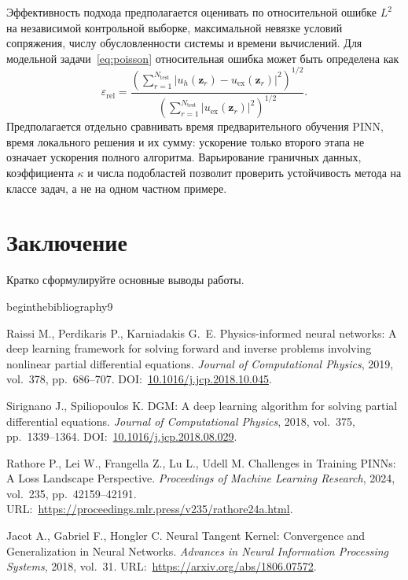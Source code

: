 \documentclass{misisarticle}
\begin{document}
Эффективность подхода предполагается оценивать по относительной ошибке $L^2$ на независимой контрольной выборке, максимальной невязке условий сопряжения, числу обусловленности системы и времени вычислений. Для модельной задачи~\eqref{eq:poisson} относительная ошибка может быть определена как
\begin{equation}
 \varepsilon_{\mathrm{rel}}=
 \frac{\left(\sum_{r=1}^{N_{\mathrm{test}}}
 |u_h(\mathbf z_r)-u_{\mathrm{ex}}(\mathbf z_r)|^2\right)^{1/2}}
 {\left(\sum_{r=1}^{N_{\mathrm{test}}}
 |u_{\mathrm{ex}}(\mathbf z_r)|^2\right)^{1/2}}.
\label{eq:relativeerror}
\end{equation}
Предполагается отдельно сравнивать время предварительного обучения PINN, время локального решения и их сумму: ускорение только второго этапа не означает ускорения полного алгоритма. Варьирование граничных данных, коэффициента $\kappa$ и числа подобластей позволит проверить устойчивость метода на классе задач, а не на одном частном примере.

\section{Заключение}

Кратко сформулируйте основные выводы работы.

begin{thebibliography}{9}

Raissi M., Perdikaris P., Karniadakis G.~E. Physics-informed neural networks: A deep learning framework for solving forward and inverse problems involving nonlinear partial differential equations. \textit{Journal of Computational Physics}, 2019, vol.~378, pp.~686--707. DOI:~\url{10.1016/j.jcp.2018.10.045}.

Sirignano J., Spiliopoulos K. DGM: A deep learning algorithm for solving partial differential equations. \textit{Journal of Computational Physics}, 2018, vol.~375, pp.~1339--1364. DOI:~\url{10.1016/j.jcp.2018.08.029}.

Rathore P., Lei W., Frangella Z., Lu L., Udell M. Challenges in Training PINNs: A Loss Landscape Perspective. \textit{Proceedings of Machine Learning Research}, 2024, vol.~235, pp.~42159--42191. URL:~\url{https://proceedings.mlr.press/v235/rathore24a.html}.

Jacot A., Gabriel F., Hongler C. Neural Tangent Kernel: Convergence and Generalization in Neural Networks. \textit{Advances in Neural Information Processing Systems}, 2018, vol.~31. URL:~\url{https://arxiv.org/abs/1806.07572}.
\end{document}
